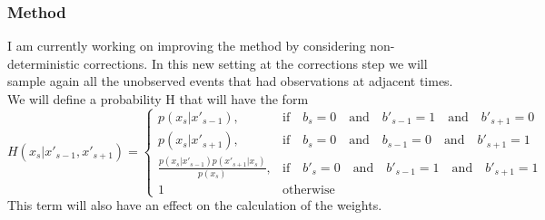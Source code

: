 \documentclass[9pt]{beamer}
\begin{document}
\begin{frame}
\frametitle{Method}
I am currently working on improving the method by considering non-deterministic corrections. 
In this new setting at the corrections step we will sample again all the unobserved events that had observations at adjacent times.  
We will define a probability H that will have the form
\[
H(x_s|x'_{s-1}, x'_{s+1}) = \begin{cases} p(x_s|x'_{s-1}), & \mbox{if} \quad b_s = 0  \quad \mbox{and} \quad b'_{s-1} = 1 \quad \mbox{and} \quad b'_{s+1} = 0\\ 
p(x_s|x'_{s+1}), & \mbox{if} \quad b_s = 0  \quad \mbox{and} \quad b_{s-1} = 0 \quad \mbox{and} \quad b'_{s+1} = 1\\
\frac{p(x_s|x'_{s-1})p(x'_{s+1}|x_s)}{p(x_s)}, & \mbox{if} \quad b'_s = 0  \quad \mbox{and} \quad b'_{s-1} = 1 \quad \mbox{and} \quad b'_{s+1} = 1\\
1 & \mbox{otherwise} \end{cases}
\]
This term will also have an effect on the calculation of the weights.
\end{frame}
\end{document}
